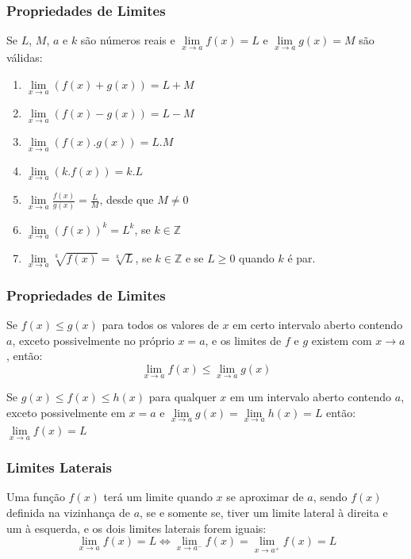 \documentclass[hyperref={pdfpagelabels=false}]{beamer}
\begin{document}
\begin{frame}
\frametitle{Propriedades de Limites}
Se $L$, $M$, $a$ e $k$ são números reais e $\lim\limits_{x \rightarrow a}f(x) = L$ e $\lim\limits_{x \rightarrow a}g(x) = M$ são válidas:
\begin{enumerate}
	\item $\lim\limits_{x \rightarrow a}(f(x) + g(x)) = L + M$
	\item $\lim\limits_{x \rightarrow a}(f(x) - g(x)) = L - M$
	\item $\lim\limits_{x \rightarrow a}(f(x) . g(x)) = L . M$
	\item $\lim\limits_{x \rightarrow a}(k.f(x)) = k.L$
	\item $\lim\limits_{x \rightarrow a}\frac{f(x)}{g(x)} = \frac{L}{M}$, desde que $M \neq 0$
	\item $\lim\limits_{x \rightarrow a}(f(x))^{k} = L^k$, se $k \in \mathbb{Z}$
	\item $\lim\limits_{x \rightarrow a}\sqrt[k]{f(x)} = \sqrt[k]{L}$, se $k \in \mathbb{Z}$ e se $L \geq 0$ quando $k$ é par.
\end{enumerate}
\end{frame}

\begin{frame}
\frametitle{Propriedades de Limites}
\begin{theorem}
	Se $f(x) \leq g(x)$ para todos os valores de $x$ em certo intervalo aberto contendo $a$, exceto possivelmente no próprio $x=a$, e os limites de $f$ e $g$ existem com $x \rightarrow a$, então:
	$$\lim\limits_{x \rightarrow a}f(x) \leq \lim\limits_{x \rightarrow a}g(x)$$
\end{theorem}

\pause

\begin{theorem}
	Se $g(x) \leq f(x) \leq h(x)$ para qualquer $x$ em um intervalo aberto contendo $a$, exceto possivelmente em $x = a$ e $\lim\limits_{x \rightarrow a}g(x) = \lim\limits_{x \rightarrow a}h(x) = L$ então: $\lim\limits_{x \rightarrow a}f(x) = L$
\end{theorem}
\end{frame}

\begin{frame}
\frametitle{Limites Laterais}

\begin{theorem}
	Uma função $f(x)$ terá um limite quando $x$ se aproximar de $a$, sendo $f(x)$ definida na vizinhança de $a$, se e somente se, tiver um limite lateral à direita e um à esquerda, e os dois limites laterais forem iguais:
	$$\lim\limits_{x \rightarrow a}f(x) = L \Leftrightarrow \lim\limits_{x \rightarrow a^{-}}f(x) = \lim\limits_{x \rightarrow a^{+}}f(x) = L$$
\end{theorem}

\end{frame}
\end{document}
